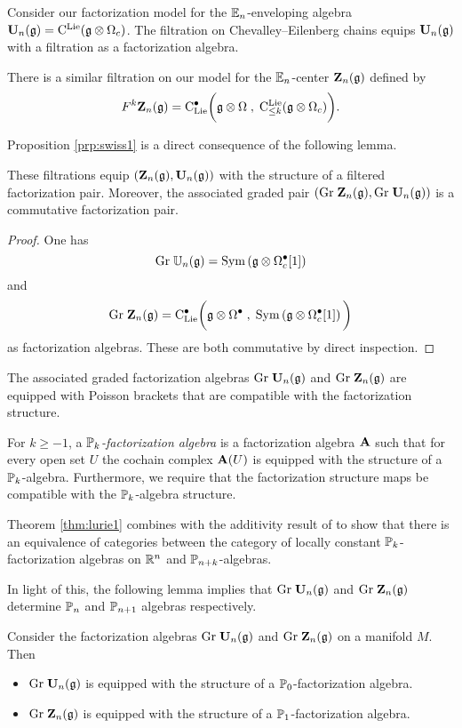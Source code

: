 \documentclass[11pt]{amsart}
\numberwithin{equation}{section}
\begin{document}
Consider our factorization model for the $\mathbb E_n$-enveloping algebra $\mathbf U_n(\mathfrak g) = {\rm C}^{\rm Lie} (\mathfrak g \otimes \Omega_c)$. 
The filtration on Chevalley--Eilenberg chains equips $\mathbf U_n(\mathfrak g)$ with a filtration as a factorization algebra. 

There is a similar filtration on our model for the $\mathbb E_n$-center $\mathbf Z_n(\mathfrak g)$ defined by
\[
F^k \mathbf Z_n(\mathfrak g) = {\rm C}_{\rm Lie}^\bullet \bigg(\mathfrak g \otimes \Omega \; , \; {\rm C}^{\rm Lie}_{\leq k} (\mathfrak g \otimes \Omega_c) \bigg) .
\]

Proposition \ref{prp:swiss1} is a direct consequence of the following lemma.

\begin{lmm}
These filtrations equip $(\mathbf Z_n (\mathfrak g), \mathbf U_n(\mathfrak g))$ with the structure of a filtered factorization pair.
Moreover, the associated graded pair $({\rm Gr} \; \mathbf Z_n (\mathfrak g), {\rm Gr} \; \mathbf U_n(\mathfrak g))$ is a commutative factorization pair. 
\end{lmm}
\begin{proof}
One has
\[
{\rm Gr} \; \mathbb U_n (\mathfrak g) = {\rm Sym} \left(\mathfrak g \otimes \Omega^\bullet_c [1] \right)
\]
and
\[
{\rm Gr} \; \mathbf Z_n (\mathfrak g) = {\rm C}_{{\rm Lie}}^\bullet\bigg(\mathfrak g \otimes \Omega^\bullet \; , \; {\rm Sym} \left(\mathfrak g \otimes \Omega^\bullet_c [1]\right) \bigg) 
\]
as factorization algebras. 
These are both commutative by direct inspection. 
\end{proof}

The associated graded factorization algebras ${\rm Gr} \; \mathbf U_n (\mathfrak g)$ and ${\rm Gr} \; \mathbf Z_n(\mathfrak g)$ are equipped with Poisson brackets that are compatible with the factorization structure. 

For $k \geq -1$, a {\em $\mathbb P_k$-factorization algebra} is a factorization algebra $\mathbf A$ such that for every open set $U$ the cochain complex $\mathbf A(U)$ is equipped with the structure of a $\mathbb P_k$-algebra. 
Furthermore, we require that the factorization structure maps be compatible with the $\mathbb P_k$-algebra structure. 

Theorem \ref{thm:lurie1} combines with the additivity result of \cite{SafronovAdd} to show that there is an equivalence of categories between the category of locally constant $\mathbb P_k$-factorization algebras on $\mathbb R^n$ and $\mathbb P_{n+k}$-algebras.  

In light of this, the following lemma implies that ${\rm Gr} \; \mathbf U_n (\mathfrak g)$ and ${\rm Gr} \; \mathbf Z_n(\mathfrak g)$ determine $\mathbb P_n$ and $\mathbb P_{n+1}$ algebras respectively. 

\begin{lmm}
\label{lmm:pois1}
Consider the factorization algebras ${\rm Gr} \; \mathbf U_n (\mathfrak g)$ and ${\rm Gr} \; \mathbf Z_n(\mathfrak g)$ on a manifold $M$.
Then
\begin{itemize}
\item ${\rm Gr} \; \mathbf U_n (\mathfrak g)$ is equipped with the structure of a $\mathbb P_0$-factorization algebra.
\item ${\rm Gr} \; \mathbf Z_n(\mathfrak g)$ is equipped with the structure of a $\mathbb P_1$-factorization algebra.
\end{itemize}
\end{lmm}
\end{document}
